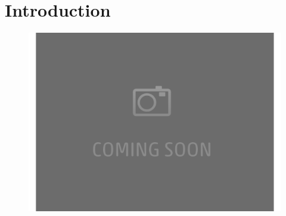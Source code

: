 
\begin{abstract}



\end{abstract}



\section{Introduction}
\begin{figure}[!h]
	\centering
	\includegraphics[width=.95\textwidth,]{figures/placeholder.pdf}
	\caption{\small
	}
	\vspace{-1.95em}
	\label{fig:moativation}
\end{figure}

